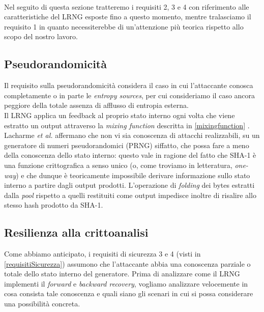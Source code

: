 \documentclass{article}
\begin{document}
 
 \paragraph{}Nel seguito di questa sezione tratteremo i requisiti 2, 3 e 4 con
 riferimento alle caratteristiche del LRNG esposte fino a questo momento,
 mentre tralasciamo il requisito 1 in quanto necessiterebbe di
 un'attenzione più teorica rispetto allo scopo del nostro lavoro.
 
 \subsection{Pseudorandomicità}
 Il requisito sulla pseudorandomicità considera il caso in cui l'attaccante
 conosca completamente o in parte le \emph{entropy sources}, per cui
 consideriamo il caso ancora peggiore della totale assenza di afflusso di
 entropia esterna.\\
 Il LRNG applica un feedback al proprio stato interno ogni volta che viene
 estratto un output attraverso la \emph{mixing function} descritta in
 \ref{mixingfunction} . Lacharme \emph{et al.} affermano che non vi sia
 conoscenza di attacchi realizzabili, su un generatore di numeri pseudorandomici
 (PRNG) siffatto, che possa fare a meno della conoscenza dello stato interno:
 questo vale in ragione del fatto che SHA-1 è una funzione crittografica a senso
 unico (o, come troviamo in letteratura, \emph{one-way}) e che dunque è teoricamente
 impossibile derivare informazione sullo stato interno a partire dagli output
 prodotti. L'operazione di \emph{folding} dei bytes estratti dalla \emph{pool}
 rispetto a quelli restituiti come output impedisce inoltre di risalire allo
 stesso hash prodotto da SHA-1.
 
 \subsection{Resilienza alla crittoanalisi}
 Come abbiamo anticipato, i requisiti di sicurezza 3 e 4 (visti in
 \ref{requisitiSicurezza}) assumono che l'attaccante abbia una conoscenza
 parziale o totale dello stato interno del generatore. Prima di analizzare come
 il LRNG implementi il \emph{forward} e \emph{backward recovery}, vogliamo
 analizzare velocemente in cosa consista tale conoscenza e quali siano gli
 scenari in cui si possa considerare una possibilità concreta.
 
\end{document}
